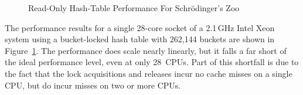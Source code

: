 \begin{figure}[tb]
\centering
{}
\caption{Read-Only Hash-Table Performance For Schr\"odinger's Zoo}
\label{fig:datastruct:Read-Only Hash-Table Performance For Schroedinger's Zoo}
\end{figure}

The performance results for a single 28-core socket of a 2.1\,GHz
Intel Xeon system using a bucket-locked hash table
with 262,144 buckets are shown in
Figure~\ref{fig:datastruct:Read-Only Hash-Table Performance For Schroedinger's Zoo}.
The performance does scale nearly linearly, but it falls a far short
of the ideal performance level, even at only 28~CPUs.
Part of this shortfall is due to the fact that the lock acquisitions and
releases incur no cache misses on a single CPU, but do incur misses
on two or more CPUs.


